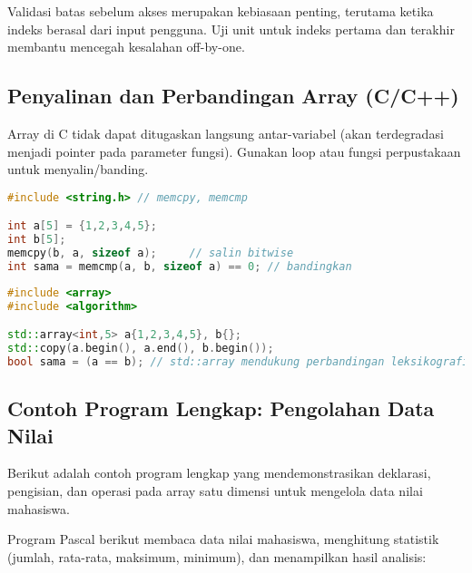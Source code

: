 \documentclass[../main.tex]{subfiles}
\begin{document}
Validasi batas sebelum akses merupakan kebiasaan penting, terutama ketika indeks berasal dari input pengguna. Uji unit untuk indeks pertama dan terakhir membantu mencegah kesalahan off-by-one.

\subsection{Penyalinan dan Perbandingan Array (C/C++)}
Array di C tidak dapat ditugaskan langsung antar-variabel (akan terdegradasi menjadi pointer pada parameter fungsi). Gunakan loop atau fungsi perpustakaan untuk menyalin/banding.

\begin{lstlisting}[language=C, caption={Salin dan bandingkan isi array (C)}]
#include <string.h> // memcpy, memcmp

int a[5] = {1,2,3,4,5};
int b[5];
memcpy(b, a, sizeof a);     // salin bitwise
int sama = memcmp(a, b, sizeof a) == 0; // bandingkan
\end{lstlisting}

\begin{lstlisting}[language=C++, caption={Salin/cek kesetaraan (C++)}]
#include <array>
#include <algorithm>

std::array<int,5> a{1,2,3,4,5}, b{};
std::copy(a.begin(), a.end(), b.begin());
bool sama = (a == b); // std::array mendukung perbandingan leksikografis
\end{lstlisting}

\subsection{Contoh Program Lengkap: Pengolahan Data Nilai}

Berikut adalah contoh program lengkap yang mendemonstrasikan deklarasi, pengisian, dan operasi pada array satu dimensi untuk mengelola data nilai mahasiswa.

Program Pascal berikut membaca data nilai mahasiswa, menghitung statistik (jumlah, rata-rata, maksimum, minimum), dan menampilkan hasil analisis:
\end{document}
